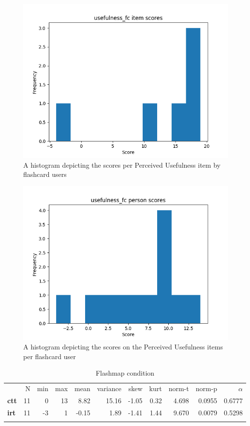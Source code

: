\begin{figure}
    \includegraphics[width=\textwidth]{img/usefulness_fc_diff.png}
    \caption{A histogram depicting the scores per Perceived Usefulness item by flashcard users}
    \label{fig:usefulness_fc_diff}
\end{figure}
\begin{figure}
    \includegraphics[width=\textwidth]{img/usefulness_fc_abil.png}
    \caption{A histogram depicting the scores on the Perceived Usefulness items per flashcard user}
    \label{fig:usefulness_fc_abil}
\end{figure}

\begin{longtable}[c]{@{}lrrrrrrrrrr@{}}
\caption{Flashmap condition}
\endfirsthead
\toprule\addlinespace
& N & min & max & mean & variance & skew & kurt & norm-t &
norm-p & $\alpha$
\\\addlinespace
\midrule
\textbf{ctt} & 11 & 0 & 13 & 8.82 & 15.16 & -1.05 & 0.32 & 4.698 &
0.0955 & 0.6777
\\\addlinespace
\textbf{irt} & 11 & -3 & 1 & -0.15 & 1.89 & -1.41 & 1.44 & 9.670 &
0.0079 & 0.5298
\\\addlinespace
\bottomrule
    \label{tab:usefulness_fm}
\end{longtable}

